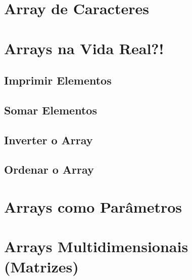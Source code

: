 \section{Array de Caracteres}

\section{Arrays na Vida Real?!}
\subsection{Imprimir Elementos}
\subsection{Somar Elementos}
\subsection{Inverter o Array}
\subsection{Ordenar o Array}

\section{Arrays como Parâmetros}

\section{Arrays Multidimensionais (Matrizes)}


